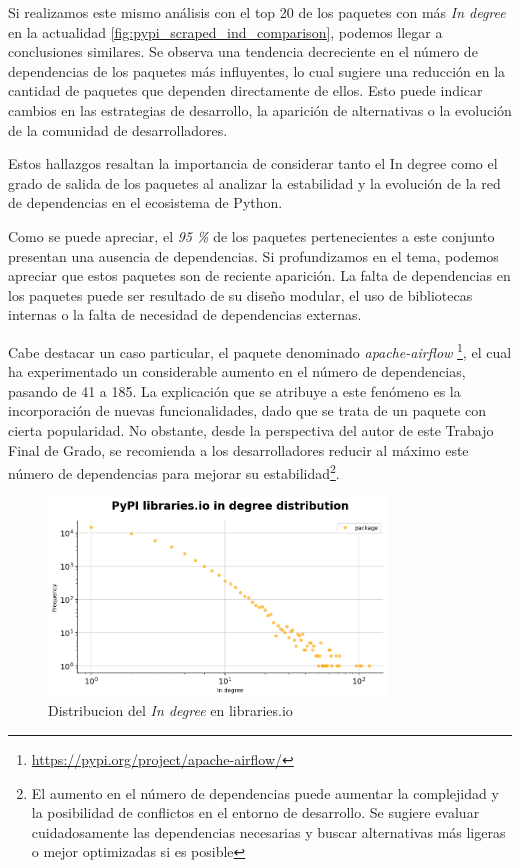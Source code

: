 Si realizamos este mismo análisis con el top 20 de los paquetes con más \textit{In degree} en la actualidad \ref{fig:pypi_scraped_ind_comparison}, podemos llegar a
conclusiones similares. Se observa una tendencia decreciente en el número de dependencias de los paquetes
más influyentes, lo cual sugiere una reducción en la cantidad de paquetes que dependen directamente de ellos.
Esto puede indicar cambios en las estrategias de desarrollo, la aparición de alternativas o la evolución de la
comunidad de desarrolladores.

Estos hallazgos resaltan la importancia de considerar tanto el In degree como el grado de salida de
los paquetes al analizar la estabilidad y la evolución de la red de dependencias en el ecosistema de Python.

Como se puede apreciar, el \textit{95 \%} de los paquetes pertenecientes a este conjunto presentan una ausencia
de dependencias.
Si profundizamos en el tema, podemos apreciar que estos paquetes son de reciente aparición. La falta de
dependencias en los paquetes puede ser resultado de su diseño modular, el uso de
bibliotecas internas o la falta de necesidad de dependencias externas.

Cabe destacar un caso particular, el paquete denominado \textit{apache-airflow}
\footnote{\url{https://pypi.org/project/apache-airflow/}}, el cual ha experimentado un considerable aumento
en el número de dependencias, pasando de 41 a 185. La explicación que se atribuye a este fenómeno es la
incorporación de nuevas funcionalidades, dado que se trata de un paquete con cierta popularidad. No obstante,
desde la perspectiva del autor de este Trabajo Final de Grado, se recomienda a los desarrolladores reducir
al máximo este número de dependencias para mejorar su estabilidad\footnote{El aumento en el número de dependencias
    puede aumentar la complejidad y la posibilidad de conflictos en el entorno de desarrollo. Se sugiere evaluar
    cuidadosamente las dependencias necesarias y buscar alternativas más ligeras o mejor optimizadas si es posible}.

\begin{figure}[h!]
    \begin{center}
        \includegraphics[width=0.8\textwidth]{img/pypi/ind_libio_d.png}
        \caption{Distribucion del \textit{In degree} en libraries.io}
        \label{fig: Distribucion del In degree en libraries.io}
    \end{center}
\end{figure}

